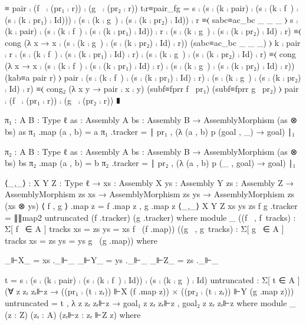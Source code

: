                            ≡ pair ⨾ (f~ ⨾ (pr₁ ⨾ r)) ⨾ (g~ ⨾ (pr₂ ⨾ r))
                         t⨾r≡pair_fg =
                           s ⨾ (s ⨾ (k ⨾ pair) ⨾ (s ⨾ (k ⨾ f~) ⨾ (s ⨾ (k ⨾ pr₁) ⨾ Id))) ⨾ (s ⨾ (k ⨾ g~) ⨾ (s ⨾ (k ⨾ pr₂) ⨾ Id)) ⨾ r
                             ≡⟨ sabc≡ac_bc _ _ _ ⟩
                           s ⨾ (k ⨾ pair) ⨾ (s ⨾ (k ⨾ f~) ⨾ (s ⨾ (k ⨾ pr₁) ⨾ Id)) ⨾ r ⨾ (s ⨾ (k ⨾ g~) ⨾ (s ⨾ (k ⨾ pr₂) ⨾ Id) ⨾ r)
                             ≡⟨ cong (λ x → x ⨾ (s ⨾ (k ⨾ g~) ⨾ (s ⨾ (k ⨾ pr₂) ⨾ Id) ⨾ r)) (sabc≡ac_bc _ _ _) ⟩
                           k ⨾ pair ⨾ r ⨾ (s ⨾ (k ⨾ f~) ⨾ (s ⨾ (k ⨾ pr₁) ⨾ Id) ⨾ r) ⨾ (s ⨾ (k ⨾ g~) ⨾ (s ⨾ (k ⨾ pr₂) ⨾ Id) ⨾ r)
                             ≡⟨ cong (λ x → x ⨾ (s ⨾ (k ⨾ f~) ⨾ (s ⨾ (k ⨾ pr₁) ⨾ Id) ⨾ r) ⨾ (s ⨾ (k ⨾ g~) ⨾ (s ⨾ (k ⨾ pr₂) ⨾ Id) ⨾ r))
                               (kab≡a pair r) ⟩
                           pair ⨾ (s ⨾ (k ⨾ f~) ⨾ (s ⨾ (k ⨾ pr₁) ⨾ Id) ⨾ r) ⨾ (s ⨾ (k ⨾ g~) ⨾ (s ⨾ (k ⨾ pr₂) ⨾ Id) ⨾ r)
                             ≡⟨ cong₂ (λ x y → pair ⨾ x ⨾ y) (subf≡fprr f~ pr₁) (subf≡fprr g~ pr₂) ⟩
                           pair ⨾ (f~ ⨾ (pr₁ ⨾ r)) ⨾ (g~ ⨾ (pr₂ ⨾ r))
                             ∎

                         
                       

  π₁ : {A B : Type ℓ} {as : Assembly A} {bs : Assembly B} → AssemblyMorphism (as ⊗ bs) as
  π₁ .map (a , b) = a
  π₁ .tracker = ∣ pr₁ , (λ (a , b) p (goal , _) → goal) ∣₁

  π₂ : {A B : Type ℓ} {as : Assembly A} {bs : Assembly B} → AssemblyMorphism (as ⊗ bs) bs
  π₂ .map (a , b) = b
  π₂ .tracker = ∣ pr₂ , (λ (a , b) p (_ , goal) → goal) ∣₁

  ⟨_,_⟩ : {X Y Z : Type ℓ}
        → {xs : Assembly X} {ys : Assembly Y} {zs : Assembly Z}
        → AssemblyMorphism zs xs
        → AssemblyMorphism zs ys
        → AssemblyMorphism zs (xs ⊗ ys)
  ⟨ f , g ⟩ .map z = f .map z , g .map z
  ⟨_,_⟩ {X} {Y} {Z} {xs} {ys} {zs} f g .tracker = ∥∥map2 untruncated (f .tracker) (g .tracker) where
    module _ 
             ((f~ , f~tracks) : Σ[ f~ ∈ A ] tracks {xs = zs} {ys = xs}  f~ (f .map))
             ((g~ , g~tracks) : Σ[ g~ ∈ A ] tracks {xs = zs} {ys = ys} g~ (g .map)) where
             
             _⊩X_ = xs ._⊩_
             _⊩Y_ = ys ._⊩_
             _⊩Z_ = zs ._⊩_
             
             t = s ⨾ (s ⨾ (k ⨾ pair) ⨾ (s ⨾ (k ⨾ f~) ⨾ Id)) ⨾ (s ⨾ (k ⨾ g~) ⨾ Id)
             untruncated : Σ[ t ∈ A ] (∀ z zᵣ zᵣ⊩z → ((pr₁ ⨾ (t ⨾ zᵣ)) ⊩X (f .map z)) × ((pr₂ ⨾ (t ⨾ zᵣ)) ⊩Y (g .map z)))
             untruncated = t , λ z zᵣ zᵣ⊩z → goal₁ z zᵣ zᵣ⊩z , goal₂ z zᵣ zᵣ⊩z where
               module _ (z : Z) (zᵣ : A) (zᵣ⊩z : zᵣ ⊩Z z) where

